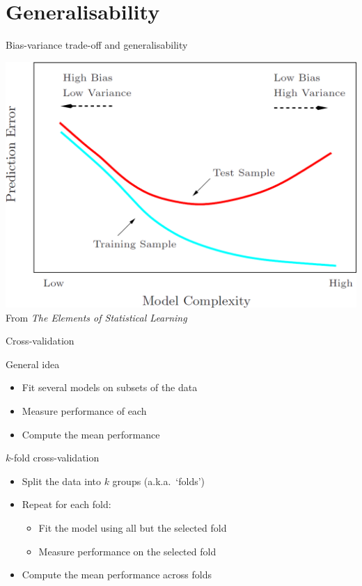 \section{Generalisability}

\begin{frame}{Bias\hyp{}variance trade\hyp{}off and generalisability}
    \begin{center}
        \includegraphics[height=0.8\textheight]{figures/generalisability} \\
        {\scriptsize%
         From \textit{The Elements of Statistical Learning}}
    \end{center}
\end{frame}

\begin{frame}{Cross\hyp{}validation}
    \begin{block}{General idea}
        \begin{itemize}
            \item Fit several models on subsets of the data
            \item Measure performance of each
            \item Compute the mean performance
        \end{itemize}
    \end{block}
\end{frame}

\begin{frame}{$k$-fold cross\hyp{}validation}
    \begin{itemize}
        \item Split the data into $k$ groups (a.k.a.\ `folds')
        \item Repeat for each fold:
              \begin{itemize}
                  \item Fit the model using all but the selected fold
                  \item Measure performance on the selected fold
              \end{itemize}
        \item Compute the mean performance across folds
    \end{itemize}
\end{frame}

